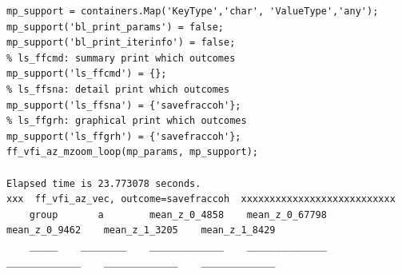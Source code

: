 \documentclass[
]{book}
\begin{document}
\begin{verbatim}
mp_support = containers.Map('KeyType','char', 'ValueType','any');
mp_support('bl_print_params') = false;
mp_support('bl_print_iterinfo') = false;
% ls_ffcmd: summary print which outcomes
mp_support('ls_ffcmd') = {};
% ls_ffsna: detail print which outcomes
mp_support('ls_ffsna') = {'savefraccoh'};
% ls_ffgrh: graphical print which outcomes
mp_support('ls_ffgrh') = {'savefraccoh'};
ff_vfi_az_mzoom_loop(mp_params, mp_support);

Elapsed time is 23.773078 seconds.
xxx  ff_vfi_az_vec, outcome=savefraccoh  xxxxxxxxxxxxxxxxxxxxxxxxxxx
    group       a        mean_z_0_4858    mean_z_0_67798    mean_z_0_9462    mean_z_1_3205    mean_z_1_8429
    _____    ________    _____________    ______________    _____________    _____________    _____________


\end{verbatim}
\end{document}
